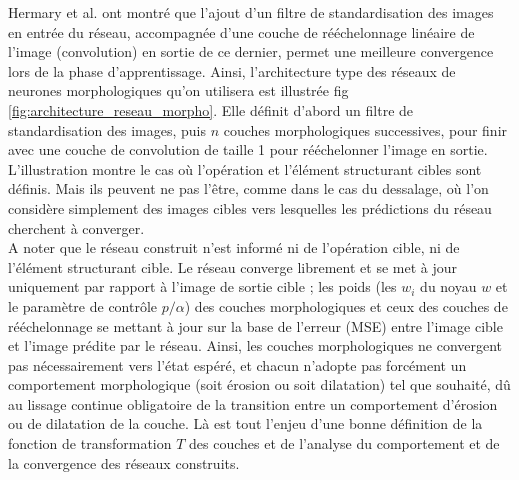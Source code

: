 \vspace{-2.2mm}
Hermary et al. \cite{Hermary_2022} ont montré que l'ajout d'un filtre de standardisation des images en entrée du réseau, accompagnée d'une couche de rééchelonnage linéaire de l'image (convolution) en sortie de ce dernier, permet une meilleure convergence lors de la phase d'apprentissage. 
Ainsi, l'architecture type des réseaux de neurones morphologiques qu'on utilisera est illustrée fig \ref{fig:architecture_reseau_morpho}. Elle définit d'abord un filtre de standardisation des images, puis $n$ couches morphologiques successives, pour finir avec une couche de convolution de taille 1 pour rééchelonner l'image en sortie. L'illustration montre le cas où l'opération et l'élément structurant cibles sont définis. Mais ils peuvent ne pas l'être, comme dans le cas du dessalage, où l'on considère simplement des images cibles vers lesquelles les prédictions du réseau cherchent à converger. \\

\vspace{-2.2mm}
A noter que le réseau construit n'est informé ni de l'opération cible, ni de l'élément structurant cible. Le réseau converge librement et se met à jour uniquement par rapport à l'image de sortie cible ; les poids (les $w_i$ du noyau $w$ et le paramètre de contrôle $p/\alpha$) des couches morphologiques et ceux des couches de rééchelonnage se mettant à jour sur la base de l'erreur (MSE) entre l'image cible et l'image prédite par le réseau. Ainsi, les couches morphologiques ne convergent pas nécessairement vers l'état espéré, et chacun n'adopte pas forcément un comportement morphologique (soit érosion ou soit dilatation) tel que souhaité, dû au lissage continue obligatoire de la transition entre un comportement d'érosion ou de dilatation de la couche. Là est tout l'enjeu d'une bonne définition de la fonction de transformation $T$ des couches et de l'analyse du comportement et de la convergence des réseaux construits.

